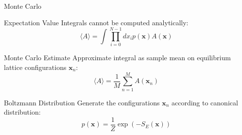\documentclass{beamer}
\begin{document}
    \begin{frame}{Monte Carlo}
        {
            \begin{block}{Expectation Value}
                Integrals cannot be computed analytically:
                {
                \begin{equation*}
                    \label{eq:MonteCarloEstimate}
                    \langle A \rangle = \int \prod_{i=0}^{N-1}{dx_i}p\left(\bm{x}\right)A\left(\bm{x}\right)
                \end{equation*}
                }
            \end{block}
        }
        {
            \begin{block}{Monte Carlo Estimate}
                {
                Approximate integral as sample mean on equilibrium lattice configurations $\bm{x}_n$:
                \begin{equation*}
                    \label{eq:MonteCarloEstimate}
                    \langle A \rangle = \frac{1}{M}\sum^{M}_{n = 1} A\left(\bm{x}_{n}\right)
                \end{equation*}
                }
            \end{block}
        }
        {
            \begin{block}{Boltzmann Distribution}
                {
                Generate the configurations $\bm{x}_n$ according to canonical distribution:
                \begin{equation*}
                    \label{eq:BoltzmannDistribution}
                    p\left(\bm{x}\right)=\frac{1}{Z}\exp\left(-S_E\left(\bm{x}\right)\right)
                \end{equation*}
                }
            \end{block}
        }
    \end{frame}
\end{document}
